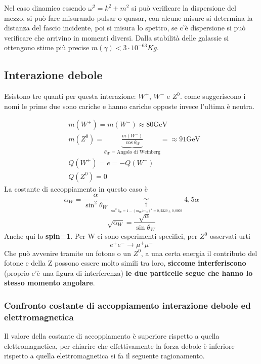 \documentclass[12pt]{book}
\begin{document}
Nel caso dinamico essendo $\omega^2 =k^2 +m^2$ si può verificare la dispersione del mezzo, si può fare misurando pulsar o quasar, con alcune misure si determina la distanza del fascio incidente, poi si misura lo spettro, se c'è dispersione si può verificare che arrivino in momenti diversi. Dalla stabilità delle galassie si ottengono stime più precise $m(\gamma) < 3 \cdot 10^{-63}Kg$.


\subsection{Interazione debole}
Esistono tre quanti per questa interazione: $W^+$, $W^-$
 e $Z^0$. come suggeriscono i nomi le prime due sono cariche e hanno cariche opposte invece l'ultima è neutra. 


 \begin{align}
 	&m(W^+) = m(W^-) \approx 80 \text{GeV}\\
 	&m(Z^0) = \underbrace{\frac{m(W^-)}{\cos \theta_W}}_{\theta_W = \text{Angolo di Weinberg}} =\approx 91 \text{GeV}\\
 	&Q(W^+)=e=-Q(W^-)\\
 	&Q(Z^0)=0
 \end{align}
 La costante di accoppiamento in questo caso è
 \begin{equation}
 	\alpha_W= \frac{\alpha}{\sin^2 \theta_W} \underset{\underset{\sin^2 \theta_W = 1 - (m_W/m_z)^2 =0,2229 \pm 0,0003}{\uparrow}}{\simeq} \boxed{4,5 \alpha}
 \end{equation}
 \begin{equation}
 	\sqrt{\alpha_W} = \frac{\sqrt{\alpha}}{\sin \theta_W}
 \end{equation}
Anche qui lo \textbf{spin=1}. Per W ci sono esperimenti specifici, per $Z^0$ osservati urti
\begin{equation}
	e^+ e^- \rightarrow \mu^+ \mu^-
\end{equation}
Che può avvenire tramite un fotone o un $Z^0$, a una certa energia il contributo del fotone e della Z possono essere molto simili tra loro, \textbf{siccome interferiscono} (proprio c'è una figura di interferenza) \textbf{le due particelle segue che hanno lo stesso momento angolare}. 

\subsubsection{Confronto costante di accoppiamento interazione debole ed elettromagnetica}
Il valore della costante di accoppiamento è superiore rispetto a quella elettromagnetica, per chiarire che effettivamente la forza debole è inferiore rispetto a quella elettromagnetica si fa il seguente ragionamento.
\end{document}

